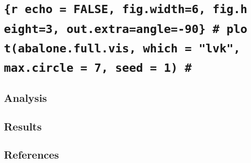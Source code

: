 \documentclass[letterpaper,9pt,twocolumn,twoside,]{pinp}
\begin{document}
\hypertarget{r-echo-false-fig.width6-fig.height3-out.extraangle-90-plotabalone.full.vis-which-lvk-max.circle-7-seed-1}{%
\section{\texorpdfstring{\texttt{\{r\ echo\ =\ FALSE,\ fig.width=6,\ fig.height=3,\ out.extra=\textquotesingle{}angle=-90\textquotesingle{}\}\ \#\ plot(abalone.full.vis,\ which\ =\ "lvk",\ max.circle\ =\ 7,\ seed\ =\ 1)\ \#}}{\{r echo = FALSE, fig.width=6, fig.height=3, out.extra='angle=-90'\} \# plot(abalone.full.vis, which = "lvk", max.circle = 7, seed = 1) \#}}\label{r-echo-false-fig.width6-fig.height3-out.extraangle-90-plotabalone.full.vis-which-lvk-max.circle-7-seed-1}}

\hypertarget{analysis-1}{%
\subsection{Analysis}\label{analysis-1}}

\hypertarget{results-1}{%
\subsection{Results}\label{results-1}}

\hypertarget{references}{%
\subsection{References}\label{references}}





\end{document}

